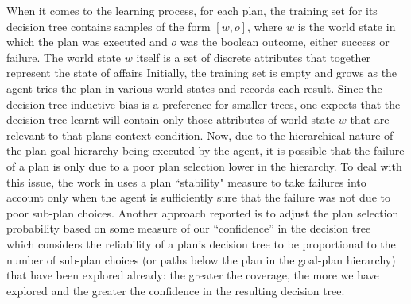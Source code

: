When it comes to the learning process, for each plan, the training set for its decision tree contains samples of the form $[w, o]$, where $w$ is the world state in which the plan was executed and $o$ was the boolean outcome, either success or failure. The world state $w$ itself is a set of discrete attributes that together represent the state of affairs Initially, the training set is empty and grows as the agent tries the plan in various world states and records each result. 
Since the decision tree inductive bias is a preference for smaller trees, one expects that the decision tree learnt will contain only those attributes of world state $w$ that are relevant to that plans context condition.
Now, due to the hierarchical nature of the plan-goal hierarchy being executed by the agent, it is possible that the failure of a plan is only due to a poor plan selection lower in the hierarchy.
To deal with this issue, the work in \cite{airiau09:enhancing} uses a plan ``stability" measure to take failures into account only when the agent is sufficiently sure that the failure was not due to poor sub-plan choices. Another approach reported is to adjust the plan selection probability based on some measure of our ``confidence'' in the decision tree~\cite{singh10:learning} which considers the reliability of a plan's decision tree to be proportional to the number of sub-plan choices (or paths below the plan in the goal-plan hierarchy) that have been explored already: the greater the coverage, the more we have explored and the greater the confidence in the resulting decision tree. 




